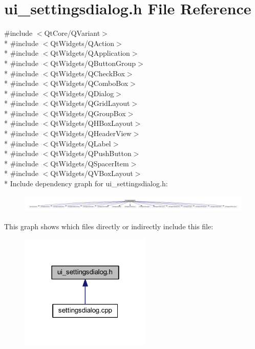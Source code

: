 \hypertarget{a00054}{\section{ui\+\_\+settingsdialog.\+h File Reference}
\label{a00054}
}
{\ttfamily \#include $<$Qt\+Core/\+Q\+Variant$>$}\\*
{\ttfamily \#include $<$Qt\+Widgets/\+Q\+Action$>$}\\*
{\ttfamily \#include $<$Qt\+Widgets/\+Q\+Application$>$}\\*
{\ttfamily \#include $<$Qt\+Widgets/\+Q\+Button\+Group$>$}\\*
{\ttfamily \#include $<$Qt\+Widgets/\+Q\+Check\+Box$>$}\\*
{\ttfamily \#include $<$Qt\+Widgets/\+Q\+Combo\+Box$>$}\\*
{\ttfamily \#include $<$Qt\+Widgets/\+Q\+Dialog$>$}\\*
{\ttfamily \#include $<$Qt\+Widgets/\+Q\+Grid\+Layout$>$}\\*
{\ttfamily \#include $<$Qt\+Widgets/\+Q\+Group\+Box$>$}\\*
{\ttfamily \#include $<$Qt\+Widgets/\+Q\+H\+Box\+Layout$>$}\\*
{\ttfamily \#include $<$Qt\+Widgets/\+Q\+Header\+View$>$}\\*
{\ttfamily \#include $<$Qt\+Widgets/\+Q\+Label$>$}\\*
{\ttfamily \#include $<$Qt\+Widgets/\+Q\+Push\+Button$>$}\\*
{\ttfamily \#include $<$Qt\+Widgets/\+Q\+Spacer\+Item$>$}\\*
{\ttfamily \#include $<$Qt\+Widgets/\+Q\+V\+Box\+Layout$>$}\\*
Include dependency graph for ui\+\_\+settingsdialog.\+h\+:
\nopagebreak
\begin{figure}[H]
\begin{center}
\leavevmode
\includegraphics[width=350pt]{d2/d82/a00279}
\end{center}
\end{figure}
This graph shows which files directly or indirectly include this file\+:
\nopagebreak
\begin{figure}[H]
\begin{center}
\leavevmode
\includegraphics[width=178pt]{d0/dcd/a00280}
\end{center}
\end{figure}
